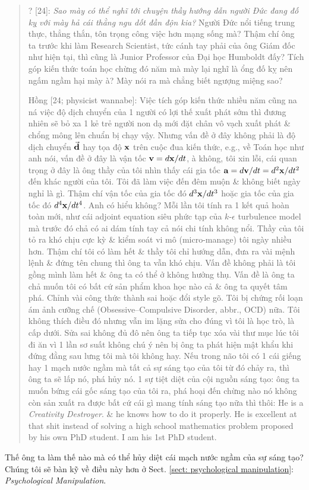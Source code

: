 \documentclass[12pt]{article}
\begin{document}
\begin{quote}
	{\sf ? [24]}: {\it Sao mày có thể nghĩ tới chuyện thầy hướng dẫn người Đức đang đố kỵ với mày hả cái thằng ngu dốt đần độn kia?} Người Đức nổi tiếng trung thực, thẳng thắn, tôn trọng công việc hơn mạng sống mà? Thậm chí ông ta trước khi làm Research Scientist, tức cánh tay phải của ông Giám đốc như hiện tại, thì cũng là Junior Professor của Đại học Humboldt đấy? Tích góp kiến thức toán học chừng đó năm mà mày lại nghĩ là ổng đố kỵ nên ngấm ngầm hại mày à? Mày nói ra mà chẳng biết ngượng miệng sao?
	
	{\sf Hồng [24; physicist wannabe]}: Việc tích góp kiến thức nhiều năm cũng na ná việc độ dịch chuyển của 1 người có lợi thế xuất phát sớm thì đương nhiên sẽ bỏ xa 1 kẻ trẻ người non dạ mới đặt chân vô vạch xuất phát \& chổng mông lên chuẩn bị chạy vậy. Nhưng vấn đề ở đây không phải là độ dịch chuyển $\vec{\bf d}$ hay tọa độ ${\bf x}$ trên cuộc đua kiến thức, e.g., về Toán học như anh nói, vấn đề ở đây là vận tốc ${\bf v} = d{\bf x}{\tt/}dt$, à không, tôi xin lỗi, cái quan trọng ở đây là ông thầy của tôi nhìn thấy cái gia tốc ${\bf a} = d{\bf v}{\tt/}dt = d^2{\bf x}{\tt/}dt^2$ đến khác người của tôi. Tôi đã làm việc đến đêm muộn \& không biết ngày nghỉ là gì. Thậm chí vận tốc của gia tốc đó $d^3{\bf x}{\tt/}dt^3$ hoặc gia tốc của gia tốc đó $d^4{\bf x}{\tt/}dt^4$. Anh có hiểu không? Mỗi lần tôi tính ra 1 kết quả hoàn toàn mới, như cái adjoint equation siêu phức tạp của $k$-$\epsilon$ turbulence model mà trước đó chả có ai dám tính tay cả nói chi tính không nổi. Thầy của tôi tỏ ra khó chịu cực kỳ \& kiểm soát vi mô (micro-manage) tôi ngày nhiều hơn. Thậm chí tôi có làm hết \& thầy tôi chỉ hướng dẫn, đưa ra vài mệnh lệnh \& đứng tên chung thì ông ta vẫn khó chịu. Vấn đề không phải là tôi gồng mình làm hết \& ông ta có thể ở không hưởng thụ. Vấn đề là ông ta chả muốn tôi có bất cứ sản phẩm khoa học nào cả \& ông ta quyết tâm phá. Chỉnh vài công thức thành sai hoặc đổi style gõ. Tôi bị chứng rối loạn ám ảnh cưỡng chế (Obsessive--Compulsive Disorder, abbr., OCD) nữa. Tôi không thích điều đó nhưng vẫn im lặng sửa cho đúng vì tôi là học trò, là cấp dưới. Sửa sai không đủ đô nên ông ta tiếp tục xóa vài thư mục lúc tôi đi ăn vì 1 lần sơ suất không chú ý nên bị ông ta phát hiện mật khẩu khi đứng đằng sau lưng tôi mà tôi không hay. Nếu trong não tôi có 1 cái giếng hay 1 mạch nước ngầm mà tất cả sự sáng tạo của tôi từ đó chảy ra, thì ông ta sẽ lấp nó, phá hủy nó. 1 sự tiệt diệt của cội nguồn sáng tạo: ông ta muốn bứng cái gốc sáng tạo của tôi ra, phá hoại đến chừng nào nó không còn sản xuất ra được bất cứ cái gì mang tính sáng tạo nữa thì thôi: He is a {\it Creativity Destroyer}. \& he knows how to do it properly. He is excellent at that shit instead of solving a high school mathematics problem proposed by his own PhD student. I am his 1st PhD student.
\end{quote}
Thế ông ta làm thế nào mà có thể hủy diệt cái mạch nước ngầm của sự sáng tạo? Chúng tôi sẽ bàn kỹ về điều này hơn ở Sect. \ref{sect: psychological manipulation}: {\it Psychological Manipulation}.
\end{document}

